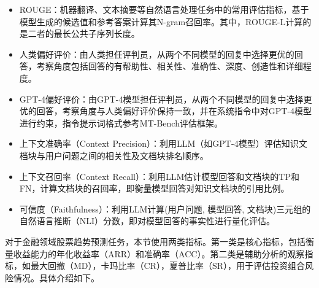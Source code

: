 \begin{itemize}[topsep = 0 pt, itemsep= 0 pt, parsep=0pt, partopsep=0pt, leftmargin=36pt, itemindent=0pt, labelsep=6pt, listparindent=24pt]
	\item ROUGE：机器翻译、文本摘要等自然语言处理任务中的常用评估指标，基于模型生成的候选值和参考答案计算其N-gram召回率。其中，ROUGE-L计算的是二者的最长公共子序列长度。
	\item 人类偏好评价：由人类担任评判员，从两个不同模型的回复中选择更优的回答，考察角度包括回答的有帮助性、相关性、准确性、深度、创造性和详细程度。
	\item GPT-4偏好评价：由GPT-4\cite{DBLP:journals/corr/abs-2303-08774}模型担任评判员，从两个不同模型的回复中选择更优的回答，考察角度与人类偏好评价保持一致，并在系统指令中对GPT-4模型进行约束，指令提示词格式参考MT-Bench\cite{zheng2023judging}评估框架。
	\item 上下文准确率（Context Precision）：利用LLM（如GPT-4模型）评估知识文档块与用户问题之间的相关性及文档块排名顺序。
	\item 上下文召回率（Context Recall）：利用LLM估计模型回答和文档块的TP和FN，计算文档块的召回率，即衡量模型回答对知识文档块的引用比例。
	\item 可信度（Faithfulness）：利用LLM计算(用户问题, 模型回答, 文档块)三元组的自然语言推断（NLI）分数，即对模型回答的事实性进行量化评估。
\end{itemize}

对于金融领域股票趋势预测任务，本节使用两类指标。第一类是核心指标，包括衡量收益能力的年化收益率（ARR）和准确率（ACC）。第二类是辅助分析的观察指标，如最大回撤（MD），卡玛比率（CR），夏普比率（SR），用于评估投资组合风险情况。具体介绍如下。

